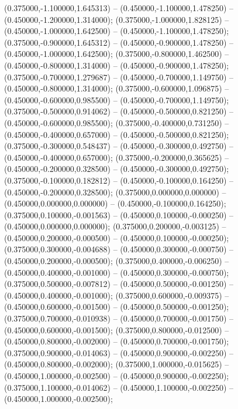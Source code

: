  (0.375000,-1.100000,1.645313) -- (0.450000,-1.100000,1.478250) -- (0.450000,-1.200000,1.314000);
 (0.375000,-1.000000,1.828125) -- (0.450000,-1.000000,1.642500) -- (0.450000,-1.100000,1.478250);
 (0.375000,-0.900000,1.645312) -- (0.450000,-0.900000,1.478250) -- (0.450000,-1.000000,1.642500);
 (0.375000,-0.800000,1.462500) -- (0.450000,-0.800000,1.314000) -- (0.450000,-0.900000,1.478250);
 (0.375000,-0.700000,1.279687) -- (0.450000,-0.700000,1.149750) -- (0.450000,-0.800000,1.314000);
 (0.375000,-0.600000,1.096875) -- (0.450000,-0.600000,0.985500) -- (0.450000,-0.700000,1.149750);
 (0.375000,-0.500000,0.914062) -- (0.450000,-0.500000,0.821250) -- (0.450000,-0.600000,0.985500);
 (0.375000,-0.400000,0.731250) -- (0.450000,-0.400000,0.657000) -- (0.450000,-0.500000,0.821250);
 (0.375000,-0.300000,0.548437) -- (0.450000,-0.300000,0.492750) -- (0.450000,-0.400000,0.657000);
 (0.375000,-0.200000,0.365625) -- (0.450000,-0.200000,0.328500) -- (0.450000,-0.300000,0.492750);
 (0.375000,-0.100000,0.182812) -- (0.450000,-0.100000,0.164250) -- (0.450000,-0.200000,0.328500);
 (0.375000,0.000000,0.000000) -- (0.450000,0.000000,0.000000) -- (0.450000,-0.100000,0.164250);
 (0.375000,0.100000,-0.001563) -- (0.450000,0.100000,-0.000250) -- (0.450000,0.000000,0.000000);
 (0.375000,0.200000,-0.003125) -- (0.450000,0.200000,-0.000500) -- (0.450000,0.100000,-0.000250);
 (0.375000,0.300000,-0.004688) -- (0.450000,0.300000,-0.000750) -- (0.450000,0.200000,-0.000500);
 (0.375000,0.400000,-0.006250) -- (0.450000,0.400000,-0.001000) -- (0.450000,0.300000,-0.000750);
 (0.375000,0.500000,-0.007812) -- (0.450000,0.500000,-0.001250) -- (0.450000,0.400000,-0.001000);
 (0.375000,0.600000,-0.009375) -- (0.450000,0.600000,-0.001500) -- (0.450000,0.500000,-0.001250);
 (0.375000,0.700000,-0.010938) -- (0.450000,0.700000,-0.001750) -- (0.450000,0.600000,-0.001500);
 (0.375000,0.800000,-0.012500) -- (0.450000,0.800000,-0.002000) -- (0.450000,0.700000,-0.001750);
 (0.375000,0.900000,-0.014063) -- (0.450000,0.900000,-0.002250) -- (0.450000,0.800000,-0.002000);
 (0.375000,1.000000,-0.015625) -- (0.450000,1.000000,-0.002500) -- (0.450000,0.900000,-0.002250);
 (0.375000,1.100000,-0.014062) -- (0.450000,1.100000,-0.002250) -- (0.450000,1.000000,-0.002500);

